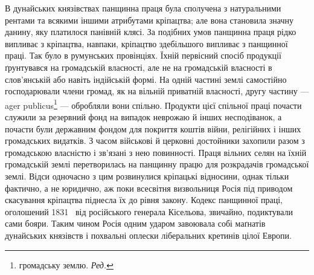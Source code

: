 В дунайських князівствах панщинна праця була сполучена
з натуральними рентами та всякими іншими атрибутами кріпацтва;
але вона становила значну данину, яку платилося панівній
клясі. За подібних умов панщинна праця рідко випливає з
кріпацтва, навпаки, кріпацтво здебільшого випливає з панщинної
праці. Так було в румунських провінціях. Їхній первісний
спосіб продукції ґрунтувався на громадській власності, але
не на громадській власності в слов’янській або навіть індійській
формі. На одній частині землі самостійно господарювали члени
громад, як на вільній приватній власності, другу частину — ager
publicus\footnote*{
громадську землю. \emph{Ред.}
} — обробляли вони спільно. Продукти цієї спільної праці
почасти служили за резервний фонд на випадок неврожаю й інших
несподіванок, а почасти були державним фондом для покриття
коштів війни, релігійних і інших громадських видатків. З часом
військові й церковні достойники захопили разом з громадською
власністю і зв’язані з нею повинності. Праця вільних селян на
їхній громадській землі перетворилась на панщинну працю для
розкрадачів громадської землі. Відси одночасно з цим розвинулися
кріпацькі відносини, однак тільки фактично, а не юридично,
аж поки всесвітня визвольниця Росія під приводом скасування
кріпацтва піднесла їх до рівня закону. Кодекс панщинної праці,
оголошений 1831~ від російського генерала Кісельова, звичайно,
подиктували сами бояри. Таким чином Росія одним ударом завоювала
собі маґнатів дунайських князівств і похвальні оплески
ліберальних кретинів цілої Европи.

